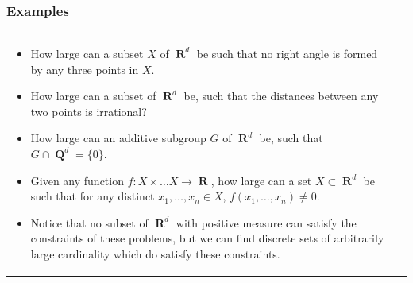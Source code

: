\documentclass[handout,usenames,dvipsnames]{beamer}
\DeclareMathOperator{\RR}{\textbf{R}}
\DeclareMathOperator{\QQ}{\textbf{Q}}
\begin{document}
\begin{frame}
  \frametitle{Examples}

\begin{tabular}{p{}p{}}

\begin{itemize}
    \item How large can a subset $X$ of $\RR^d$ be such that no right angle is formed by any three points in $X$.

    \pause
    \item How large can a subset of $\RR^d$ be, such that the distances between any two points is irrational?

    \pause
    \item How large can an additive subgroup $G$ of $\RR^d$ be, such that $G \cap \QQ^d = \{ 0 \}$.

    \pause
    \item Given any function $f: X \times \dots X \to \RR$, how large can a set $X \subset \RR^d$ be such that for any distinct $x_1, \dots, x_n \in X$, $f(x_1, \dots, x_n) \neq 0$.

    \pause
    \item Notice that no subset of $\RR^d$ with positive measure can satisfy the constraints of these problems, but we can find discrete sets of arbitrarily large cardinality which do satisfy these constraints.
\end{itemize}

\end{tabular}
\end{frame}
\end{document}
